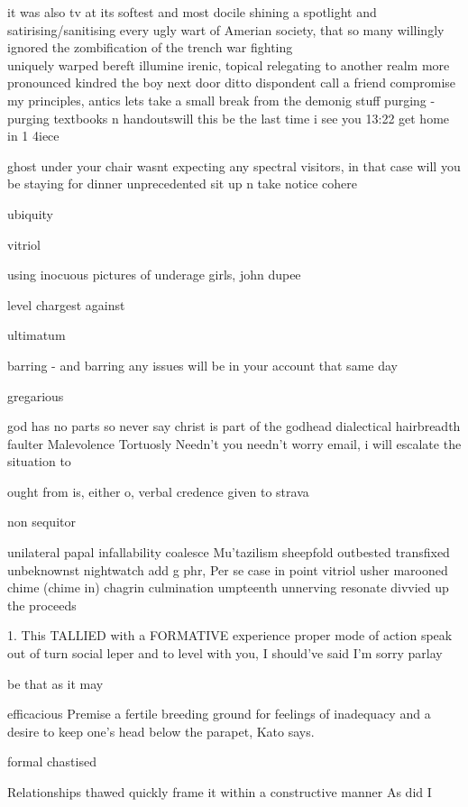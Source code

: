 it was also tv at its softest and most docile
shining a spotlight and satirising/sanitising every ugly wart of Amerian society, that so many willingly ignored
the zombification of the
trench war fighting\\
uniquely warped
bereft illumine irenic, topical relegating to another realm
more pronounced
kindred
the boy next door
ditto
dispondent
call a friend
compromise my principles, antics
lets take a small break from the demonig stuff
purging - purging textbooks n handoutswill this be the last time i see you
13:22
get home in 1 4iece


ghost under your chair
wasnt expecting any spectral visitors, in that case will you be staying for dinner
unprecedented
sit up n take notice
cohere



ubiquity

vitriol

using inocuous pictures of underage girls, john dupee

level chargest against

ultimatum

barring - and barring any issues will be in your account that same day

gregarious

god has no parts so never say christ is part of the godhead
dialectical
hairbreadth
faulter
Malevolence
Tortuosly
Needn't you needn't worry
email, i will escalate the situation to

ought from is, either o, verbal credence given to
strava

non sequitor

unilateral papal infallability
coalesce
Mu'tazilism
sheepfold
outbested
transfixed
unbeknownst
nightwatch
add g phr,
Per se
case in point
vitriol
usher
marooned
chime (chime in)
chagrin
culmination
umpteenth
unnerving
resonate
divvied up the proceeds

1. This TALLIED with a FORMATIVE experience
proper mode of action
speak out of turn
social leper
and to level with you, I should've said I'm sorry
parlay

be that as it may

efficacious
Premise
 a fertile breeding ground for feelings of inadequacy and a desire to keep one’s head below the parapet, Kato says.

formal
chastised

Relationships thawed
quickly frame it within a constructive manner
As did I

